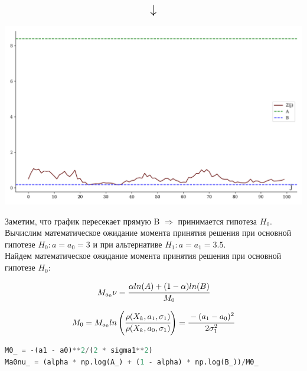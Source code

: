 \documentclass[a4paper, 14pt]{extarticle}
\begin{document}
\vfill

\begin{equation*}
    \scalebox{1.5}{
        $\downarrow$
    }
\end{equation*}

\vfill\newpage

\begin{center}
    \includegraphics[width=\textwidth, height=\textheight, keepaspectratio]{iterative_crit_A_B} \\
\end{center}

Заметим, что график пересекает прямую B $\Rightarrow$ принимается гипотеза $H_0$.\\

Вычислим математическое ожидание момента принятия решения при основной гипотезе 
$H_0: a = a_0 = 3$ и при альтернативе $H_1: a = a_1 = 3.5$.\\

Найдем математическое ожидание момента принятия решения при основной гипотезе $H_0$:

\begin{equation*}
    M_{a_0}\nu = \cfrac{\alpha ln(A) + (1 - \alpha)ln(B)}{M_0}
\end{equation*}

\begin{equation*}
    M_0 = M_{a_0}ln\left(\cfrac{\rho(X_k, a_1, \sigma_1)}{\rho(X_k, a_0, \sigma_1)}\right) = 
    \cfrac{-(a_1 - a_0)^2}{2\sigma^2_1}
\end{equation*}

\begin{center}
  \begin{lstlisting}[language=Python]
M0_ = -(a1 - a0)**2/(2 * sigma1**2)
Ma0nu_ = (alpha * np.log(A_) + (1 - alpha) * np.log(B_))/M0_
  \end{lstlisting}
\end{center}
\end{document}
